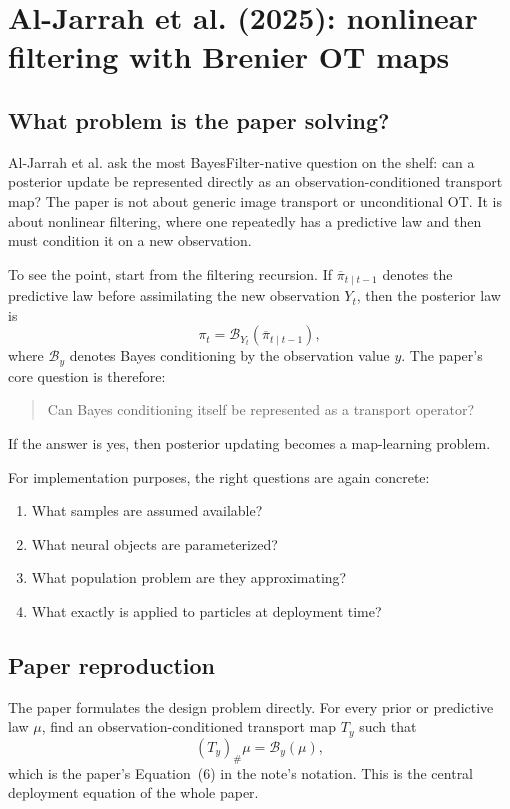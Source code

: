 \documentclass[11pt]{report}
\newcommand{\pushf}[2]{\left(#1\right)_{\#} #2}
\begin{document}
\section{Al-Jarrah et al. (2025): nonlinear filtering with Brenier OT maps}

\subsection*{What problem is the paper solving?}

Al-Jarrah et al. ask the most BayesFilter-native question on the shelf: can a
posterior update be represented directly as an observation-conditioned transport
map?  The paper is not about generic image transport or unconditional OT.  It is
about nonlinear filtering, where one repeatedly has a predictive law and then must
condition it on a new observation.

To see the point, start from the filtering recursion.  If $\overline\pi_{t\mid t-1}$
denotes the predictive law before assimilating the new observation $Y_t$, then the
posterior law is
\begin{equation}
\pi_t = \mathcal B_{Y_t}(\overline\pi_{t\mid t-1}),
\label{eq:filtering-conditioning-operator}
\end{equation}
where $\mathcal B_y$ denotes Bayes conditioning by the observation value $y$.  The
paper's core question is therefore:
\begin{quote}
Can Bayes conditioning itself be represented as a transport operator?
\end{quote}
If the answer is yes, then posterior updating becomes a map-learning problem.

For implementation purposes, the right questions are again concrete:
\begin{enumerate}[label=(\roman*)]
  \item What samples are assumed available?
  \item What neural objects are parameterized?
  \item What population problem are they approximating?
  \item What exactly is applied to particles at deployment time?
\end{enumerate}

\subsection*{Paper reproduction}

The paper formulates the design problem directly.  For every prior or predictive
law $\mu$, find an observation-conditioned transport map $T_y$ such that
\begin{equation}
\pushf{T_y}{\mu} = \mathcal B_y(\mu),
\label{eq:aljarrah-design-problem}
\end{equation}
which is the paper's Equation~(6) in the note's notation.  This is the central
deployment equation of the whole paper.
\end{document}
